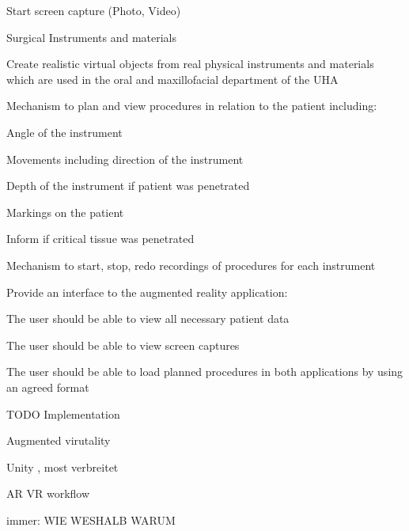 \begin{compactenum}[label=(\alph*)]
\begin{compactenum}[label=(\alph*)]
            \item Start screen capture (Photo, Video)
        \end{compactenum}
    \item Surgical Instruments and materials
        \begin{compactenum}[label=(\alph*)]
            \item Create realistic virtual objects from real physical instruments and materials which are used in the oral and maxillofacial department of the UHA
            \item Mechanism to plan and view procedures in relation to the patient including:          
                \begin{compactenum}[label=(\alph*)]
                    \item Angle of the instrument
                    \item Movements including direction of the instrument
                    \item Depth of the instrument if patient was penetrated
                    \item Markings on the patient
                    \item Inform if critical tissue was penetrated
                \end{compactenum}
            \item Mechanism to start, stop, redo recordings of procedures for each instrument
        \end{compactenum}
    \item Provide an interface to the augmented reality application:
        \begin{compactenum}[label=(\alph*)]
            \item The user should be able to view all necessary patient data
            \item The user should be able to view screen captures
            \item The user should be able to load planned procedures in both applications by using an agreed format
        \end{compactenum}
\end{compactenum}

TODO Implementation

Augmented virutality

Unity , most verbreitet 

AR VR workflow

immer: WIE WESHALB WARUM



